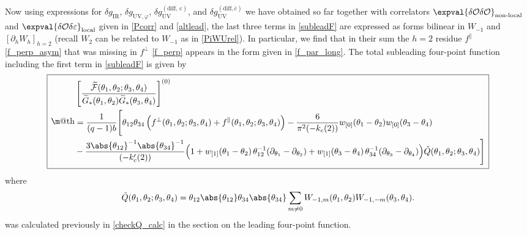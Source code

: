 \documentclass[12pt]{article}
\makeatletter
\newcommand*{\wideboxed}[1]{\setlength{\fboxsep}{1ex}%
  \fbox{\m@th$\displaystyle#1$}}
\newcommand{\calF}{\mathcal{F}}
\newcommand{\loc}{\text{local}}
\newcommand{\nloc}{\text{non-local}}
\newcommand{\IR}{\text{IR}}
\newcommand{\UV}{\text{UV}}
\newcommand{\tG}{\widetilde{G}}
\newcommand{\tF}{\widetilde{\calF}}
\newcommand{\OO}{\mathcal{O}}
\newcommand{\tht}{\theta}
\newcommand{\de}{\delta}
\newcommand{\vep}{\varepsilon}
\newcommand{\vp}{\varphi}
\newcommand{\be}{\begin{equation}}
\newcommand{\ee}{\end{equation}}
\newcommand{\ov}{\over}
\newcommand{\p}{\partial}
\makeatother
\begin{document}
Now using expressions for $\de g_{\IR}$, $\de g_{\UV, \vp}$, $\de g_{\UV}^{(\text{diff, c})}$, and $\de g_{\UV}^{(\text{diff}, \bar{c})}$ we have obtained so far together with correlators $\expval{\de \OO \de \OO}_{\nloc}$ and $\expval{\de \OO \de \vep}_{\loc}$ given in \eqref{Pcorr} and \eqref{altlead}, the last three terms in \eqref{subleadF} are expressed as forms bilinear in $W_{-1}$ and $\left[\p_h W_h\right]_{h=2}$ (recall $W_2$ can be related to $W_{-1}$ as in \eqref{PiWUrel}). In particular, we find that in their sum the $h=2$ residue $f^{\parallel}$ \eqref{f_perp_asym} that was missing in $f^{\perp}$ \eqref{f_perp} appears in the form given in \eqref{f_par_long}. The total subleading four-point function including the first term in \eqref{subleadF} is given by
\begin{equation}
\wideboxed{\begin{aligned}
&\left[{\tF(\tht_1, \tht_2; \tht_3, \tht_4) \ov \tG_*(\tht_1, \tht_2)\tG_*(\tht_3, \tht_4)}\right]^{(0)}
\\
&={1 \ov (q-1)b}\Bigg[\tht_{12}\tht_{34}\left( f^{\perp}(\tht_1, \tht_2; \tht_3, \tht_4)+f^{\parallel}(\tht_1, \tht_2; \tht_3, \tht_4)\right)-{6 \ov \pi^2(-k_c(2))}w_{[0]}(\tht_1-\tht_2)w_{[0]}(\tht_3-\tht_4)
\\
&-{3 \abs{\tht_{12}}^{-1}\abs{\tht_{34}}^{-1} \ov (-k'_c(2))} \Bigl( 1+w_{[1]}(\tht_1-\tht_2)\,\tht_{12}^{-1}(\p_{\tht_1}-\p_{\tht_2})
+w_{[1]}(\tht_3-\tht_4)\,\tht_{34}^{-1}(\p_{\tht_3}-\p_{\tht_4})\Bigr)
\check{Q}(\tht_1, \tht_2; \tht_3, \tht_4)\Bigg]
\end{aligned}}
\end{equation}
where 
\be
\check{Q}(\tht_1, \tht_2; \tht_3, \tht_4)=\tht_{12}\abs{\tht_{12}}\tht_{34}\abs{\tht_{34}}\sum_{m \neq 0}W_{-1,m}(\tht_1, \tht_2)W_{-1, -m}(\tht_3, \tht_4).
\ee
was calculated previously in \eqref{checkQ_calc} in the section on the leading four-point function.
\end{document}
